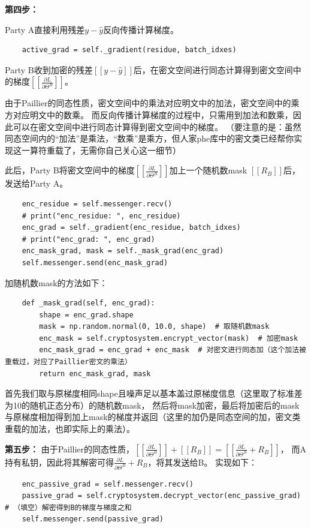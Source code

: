 \documentclass[twoside,11pt]{article}
\begin{document}
\textbf{第四步：}

Party A直接利用残差$y-\hat{y}$反向传播计算梯度。
\begin{lstlisting}
    active_grad = self._gradient(residue, batch_idxes)
\end{lstlisting}

Party B收到加密的残差$[[ y-\hat{y} ]]$后，在密文空间进行同态计算得到密文空间中的梯度$[[\frac{\partial L}{\partial \Theta^B}]]$。

由于Paillier的同态性质，密文空间中的乘法对应明文中的加法，密文空间中的乘方对应明文中的数乘。
而反向传播计算梯度的过程中，只需用到加法和数乘，因此可以在密文空间中进行同态计算得到密文空间中的梯度。
（要注意的是：虽然同态空间内的“加法”是乘法，“数乘”是乘方，但人家phe库中的密文类已经帮你实现这一算符重载了，无需你自己关心这一细节）

此后，Party B将密文空间中的梯度$[[\frac{\partial L}{\partial \Theta^B}]]$加上一个随机数mask $[[R_B]]$后，发送给Party A。
\begin{lstlisting}
    enc_residue = self.messenger.recv()
    # print("enc_residue: ", enc_residue)
    enc_grad = self._gradient(enc_residue, batch_idxes)
    # print("enc_grad: ", enc_grad)
    enc_mask_grad, mask = self._mask_grad(enc_grad)
    self.messenger.send(enc_mask_grad)
\end{lstlisting}

加随机数mask的方法如下：
\begin{lstlisting}
    def _mask_grad(self, enc_grad):
        shape = enc_grad.shape
        mask = np.random.normal(0, 10.0, shape)  # 取随机数mask
        enc_mask = self.cryptosystem.encrypt_vector(mask)  # 加密mask
        enc_mask_grad = enc_grad + enc_mask  # 对密文进行同态加（这个加法被重载过，对应了Paillier密文的乘法）
        return enc_mask_grad, mask
\end{lstlisting}

首先我们取与原梯度相同shape且噪声足以基本盖过原梯度信息（这里取了标准差为10的随机正态分布）的随机数mask，
然后将mask加密，最后将加密后的mask与原梯度相加得到加上mask的梯度并返回（这里的加仍是同态空间的加，密文类重载的加法，也即实际上的乘法）。

\textbf{第五步：}
由于Paillier的同态性质，$[[\frac{\partial L}{\partial \Theta^B}]]+[[R_B]]=[[\frac{\partial L}{\partial \Theta^B}+R_B]]$，
而A持有私钥，因此将其解密可得$\frac{\partial L}{\partial \Theta^B}+R_B$，将其发送给B。
实现如下：
\begin{lstlisting}
    enc_passive_grad = self.messenger.recv()
    passive_grad = self.cryptosystem.decrypt_vector(enc_passive_grad)  # （填空）解密得到B的梯度与梯度之和
    self.messenger.send(passive_grad)
\end{lstlisting}
\end{document}
